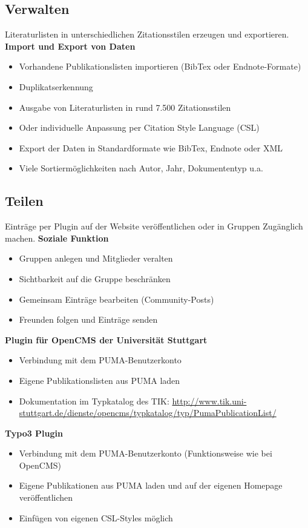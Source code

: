 \subsection{Verwalten}
Literaturlisten in unterschiedlichen Zitationsstilen erzeugen und exportieren.\newline\newline
\textbf{Import und Export von Daten}
\begin{itemize}
\item Vorhandene Publikationslisten importieren (BibTex oder Endnote-Formate)
\item Duplikatserkennung
\item Ausgabe von Literaturlisten in rund 7.500 Zitationsstilen
\item Oder individuelle Anpassung per Citation Style Language (CSL)
\item Export der Daten in Standardformate wie BibTex, Endnote oder XML
\item Viele Sortiermöglichkeiten nach Autor, Jahr, Dokumententyp u.a.
\end{itemize}
\subsection{Teilen}
Einträge per Plugin auf der Website veröffentlichen oder in Gruppen Zugänglich machen.\newline\newline
\textbf{Soziale Funktion}
\begin{itemize}
\item Gruppen anlegen und Mitglieder veralten
\item Sichtbarkeit auf die Gruppe beschränken
\item Gemeinsam Einträge bearbeiten (Community-Posts)
\item Freunden folgen und Einträge senden
\end{itemize}
\textbf{Plugin für OpenCMS der Universität Stuttgart}
\begin{itemize}
\item Verbindung mit dem PUMA-Benutzerkonto
\item Eigene Publikationslisten aus PUMA laden
\item Dokumentation im Typkatalog des TIK: \url{http://www.tik.uni-stuttgart.de/dienste/opencms/typkatalog/typ/PumaPublicationList/}
\end{itemize} 
\textbf{Typo3 Plugin}
\begin{itemize}
\item Verbindung mit dem PUMA-Benutzerkonto (Funktionsweise wie bei OpenCMS)
\item Eigene Publikationen aus PUMA laden und auf der eigenen Homepage veröffentlichen
\item Einfügen von eigenen CSL-Styles möglich
\end{itemize}